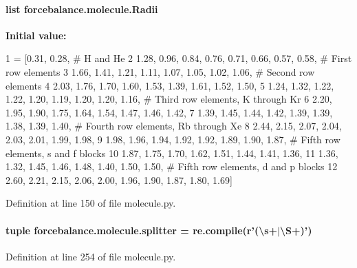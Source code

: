 \hypertarget{namespaceforcebalance_1_1molecule_a74f55a89a14ca676b5a06441d1fdab19}{
\paragraph[{Radii}]{\setlength{\rightskip}{0pt plus 5cm}list forcebalance.\-molecule.\-Radii}}\label{namespaceforcebalance_1_1molecule_a74f55a89a14ca676b5a06441d1fdab19}
{\bfseries Initial value\-:}
\begin{DoxyCode}
1 = [0.31, 0.28, \textcolor{comment}{# H and He}
2          1.28, 0.96, 0.84, 0.76, 0.71, 0.66, 0.57, 0.58, \textcolor{comment}{# First row elements}
3          1.66, 1.41, 1.21, 1.11, 1.07, 1.05, 1.02, 1.06, \textcolor{comment}{# Second row elements}
4          2.03, 1.76, 1.70, 1.60, 1.53, 1.39, 1.61, 1.52, 1.50, 
5          1.24, 1.32, 1.22, 1.22, 1.20, 1.19, 1.20, 1.20, 1.16, \textcolor{comment}{# Third row elements, K through Kr}
6          2.20, 1.95, 1.90, 1.75, 1.64, 1.54, 1.47, 1.46, 1.42, 
7          1.39, 1.45, 1.44, 1.42, 1.39, 1.39, 1.38, 1.39, 1.40, \textcolor{comment}{# Fourth row elements, Rb through Xe}
8          2.44, 2.15, 2.07, 2.04, 2.03, 2.01, 1.99, 1.98, 
9          1.98, 1.96, 1.94, 1.92, 1.92, 1.89, 1.90, 1.87, \textcolor{comment}{# Fifth row elements, s and f blocks}
10          1.87, 1.75, 1.70, 1.62, 1.51, 1.44, 1.41, 1.36, 
11          1.36, 1.32, 1.45, 1.46, 1.48, 1.40, 1.50, 1.50, \textcolor{comment}{# Fifth row elements, d and p blocks}
12          2.60, 2.21, 2.15, 2.06, 2.00, 1.96, 1.90, 1.87, 1.80, 1.69]
\end{DoxyCode}


Definition at line 150 of file molecule.\-py.

\hypertarget{namespaceforcebalance_1_1molecule_a09d04113accea9c88b084051c5de29d1}{
\paragraph[{splitter}]{\setlength{\rightskip}{0pt plus 5cm}tuple forcebalance.\-molecule.\-splitter = re.\-compile(r'(\textbackslash{}s+$|$\textbackslash{}S+)')}}\label{namespaceforcebalance_1_1molecule_a09d04113accea9c88b084051c5de29d1}


Definition at line 254 of file molecule.\-py.

